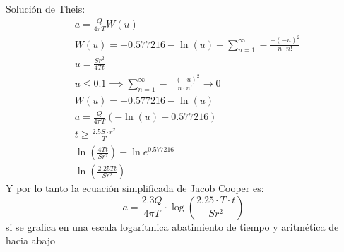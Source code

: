 Solución de Theis:
\begin{align}
    &a = \frac{Q}{4\pi T}W(u)\\
    &W(u) = - 0.577216 - \ln{\left(u\right)} + \sum_{n = 1}^{\infty} - \frac{ -( -u)^2}{n \cdot n!}\\
    &u = \frac{Sr^2}{4Tt}\\
    &u\leq 0.1\implies \sum_{n = 1}^{\infty} - \frac{ -( -u)^2}{n \cdot n!} \to 0\\
    &W(u) = - 0.577216 - \ln{(u)}\\
    &a = \frac{Q}{4\pi T}\left( -\ln{(u)} - 0.577216 \right)\\
    &t\geq \frac{2.5S \cdot r^2}{T}\\
    &\ln{\left(\frac{4Tt}{Sr^2}\right)} - \ln{e^{0.577216}}\\
    &\ln{\left(\frac{2.25Tt}{Sr^2}\right)}
\end{align}
Y por lo tanto la ecuación simplificada de Jacob Cooper es:
\begin{equation}
    a = \frac{2.3Q}{4\pi T}\cdot \log{\left(\frac{2.25 \cdot T \cdot t}{Sr^2}\right)}
\end{equation}
si se grafica en una escala logarítmica abatimiento de tiempo y aritmética de hacia abajo
